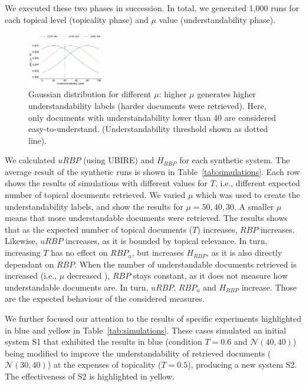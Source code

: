 We executed these two phases in succession. In total, we generated 1,000 runs for each topical level (topicality phase) and $\mu$ value (understandability phase). 

\begin{figure}[t!]
  \centering
   \includegraphics[width=0.30\textwidth]{figs/gaussians}
    \vspace{-.2cm}
    \caption{Gaussian distribution for different $\mu$: higher $\mu$ generates higher understandability labels (harder documents were retrieved). Here, only documents with understandability lower than 40 are considered easy-to-understand. (Understandability threshold shown as dotted line). \vspace{-16pt}}
  \label{fig:gaussians}
\end{figure}


We calculated $uRBP$ (using UBIRE) and $H_{RBP}$ for each synthetic system.
The average result of the synthetic runs is shown in Table~\ref{tab:simulations}. Each row shows the results of simulations with different values for $T$, i.e., different expected number of topical documents retrieved.
We varied $\mu$ which was used to create the understandability labels, and show the results for $\mu = 50, 40, 30$.
A smaller $\mu$ means that more understandable documents were retrieved. The results shows that as the expected number of topical documents ($T$) increases, $RBP$ increases. Likewise, $uRBP$ increases, as it is bounded by topical relevance.
In turn, increasing $T$ has no effect on $RBP_u$, but increases $H_{RBP}$, as it is also directly dependant on $RBP$. When the number of understandable documents retrieved is increased (i.e., $\mu$ decreased ), $RBP$ stays constant, as it does not measure how understandable documents are.
In turn, $uRBP$, $RBP_u$ and $H_{RBP}$ increase. 
Those are the expected behaviour of the considered measures. %

We further focused our attention to the results of specific experiments highlighted in blue and yellow in Table~\ref{tab:simulations}. These cases simulated an initial system S1 that exhibited the results in blue (condition $T=0.6$ and $\mathcal{N}(40,40)$) being modified to improve the understandability of retrieved documents ($\mathcal{N}(30,40)$) at the expenses of topicality ($T=0.5$), producing a new system S2. The effectiveness of S2 is highlighted in yellow. 

